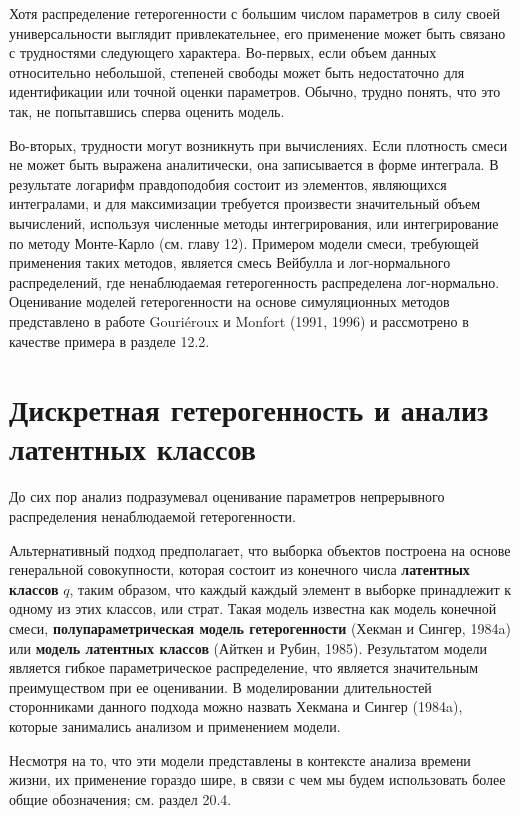 Хотя распределение гетерогенности с большим числом параметров в силу своей универсальности выглядит привлекательнее, его применение может быть связано с трудностями следующего характера. Во-первых, если объем данных относительно небольшой, степеней свободы может быть недостаточно для идентификации или точной оценки параметров. Обычно, трудно понять, что это так, не попытавшись сперва оценить модель.

Во-вторых, трудности могут возникнуть при вычислениях. Если плотность смеси не может быть выражена аналитически, она записывается в форме интеграла. В результате логарифм правдоподобия состоит из элементов, являющихся интегралами, и для максимизации требуется произвести значительный объем вычислений, используя численные методы интегрирования, или интегрирование по методу Монте-Карло (см. главу 12). %
Примером модели смеси, требующей применения таких методов, является смесь Вейбулла и лог-нормального распределений, где ненаблюдаемая гетерогенность распределена лог-нормально. Оценивание моделей гетерогенности на основе симуляционных методов представлено в работе Gouri\'eroux и Monfort (1991, 1996) и рассмотрено в качестве примера в разделе 12.2. %




\section{Дискретная гетерогенность и анализ латентных классов}\label{sec:18.5}

\noindent
До сих пор анализ подразумевал оценивание параметров непрерывного распределения ненаблюдаемой гетерогенности.

Альтернативный подход предполагает, что выборка объектов построена на основе генеральной совокупности, которая состоит из конечного числа \textbf{латентных классов} $q$, таким образом, что каждый каждый элемент в выборке принадлежит к одному из этих классов, или страт. Такая модель известна как модель конечной смеси, \textbf{полупараметрическая модель гетерогенности} (Хекман и Сингер, 1984a) или \textbf{модель латентных классов} (Айткен и Рубин, 1985). Результатом модели является гибкое параметрическое распределение, что является значительным преимуществом при ее оценивании. В моделировании длительностей сторонниками данного подхода можно назвать Хекмана и Сингер (1984a), которые занимались анализом и применением модели.

Несмотря на то, что эти модели представлены в контексте анализа времени жизни, их применение гораздо шире, в связи с чем мы будем использовать более общие обозначения; см. раздел 20.4. %


